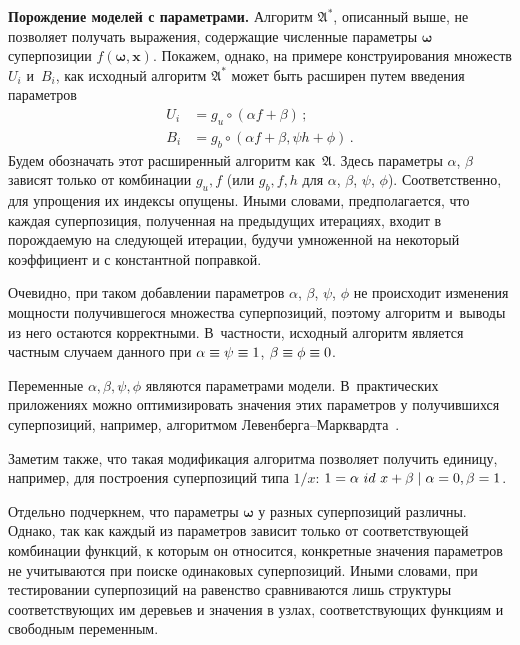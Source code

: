 \begin{multicols}{2}
\smallskip

\noindent
\textbf{Порождение моделей с параметрами.}
Алгоритм $\mathfrak{A^*}$, описанный выше, не позволяет получать выражения, содержащие численные
параметры $\boldsymbol{\omega}$ суперпозиции $f(\boldsymbol{\omega}, \mathbf{x})$.
Покажем, однако, на примере конструирования множеств $U_i$ и~$B_i$, как
исходный алгоритм $\mathfrak{A^*}$ может быть расширен путем введения параметров
\begin{align*}
U_i &= g_u \circ (\alpha f + \beta) \,;
\\
B_i &=  g_b \circ (\alpha f + \beta, \psi h + \phi) \,.
\end{align*}
Будем обозначать этот расширенный алгоритм как~$\mathfrak{A}$. Здесь
параметры $\alpha$, $\beta$ зависят только от комбинации $g_u, f$ (или
$g_b, f, h$ для $\alpha$, $\beta$, $\psi$, $\phi$). Соответственно, для
упрощения их индексы опущены. Иными словами, предполагается, что
каждая суперпозиция, полученная на предыдущих итерациях, входит
в порождаемую на следующей итерации, будучи умноженной на некоторый
коэффициент и с константной поправкой.

Очевидно, при таком добавлении параметров $\alpha$, $\beta$, $\psi$,
$\phi$ не происходит изменения мощности получившегося множества
суперпозиций, поэтому алгоритм и~выводы из него остаются
корректными. В~частности, исходный алгоритм является частным случаем
данного при $\alpha \hm\equiv \psi \hm\equiv 1$, $\beta \hm\equiv \phi \hm\equiv 0$.

Переменные $\alpha, \beta, \psi, \phi$ являются параметрами модели. 
В~практических приложениях можно оптимизировать значения этих параметров у
получившихся суперпозиций, например, алгоритмом 
Ле\-вен\-бер\-га--Марк\-вард\-та~\cite{Marquardt1963Algorithm, more:78}.

Заметим также, что такая модификация алгоритма позволяет получить единицу,
например, для построения суперпозиций типа ${1}/{x}$:
$1 \hm= \alpha\ id\ x + \beta \mid \alpha = 0, \beta \hm= 1$.

Отдельно подчеркнем, что параметры $\boldsymbol{\omega}$ у разных
суперпозиций различны. Однако, так как каж\-дый из па\-ра\-мет\-ров зависит только
от со\-от\-вет\-ст\-ву\-ющей комбинации функций, к которым он относит\-ся, конкретные
значения параметров не учитываются при поиске одинаковых суперпозиций.
Иными словами, при тестировании суперпозиций на равенство сравниваются лишь
структуры соответствующих им деревьев и значения в узлах, соответствующих
функциям и свободным переменным.


\end{multicols}
